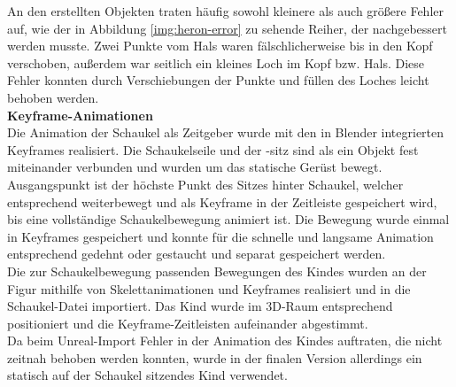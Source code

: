 \documentclass{Bericht}
\begin{document}
An den erstellten Objekten traten häufig sowohl kleinere als auch größere Fehler auf, wie der in Abbildung \ref{img:heron-error} zu sehende Reiher, der nachgebessert werden musste. Zwei Punkte vom Hals waren fälschlicherweise bis in den Kopf verschoben, außerdem war seitlich ein kleines Loch im Kopf bzw. Hals. Diese Fehler konnten durch Verschiebungen der Punkte und füllen des Loches leicht behoben werden.\\	
		 
\textbf{Keyframe-Animationen}\\
Die Animation der Schaukel als Zeitgeber wurde mit den in Blender integrierten Keyframes realisiert. Die Schaukelseile und der -sitz sind als ein Objekt fest miteinander verbunden und wurden um das statische Gerüst bewegt. Ausgangspunkt ist der höchste Punkt des Sitzes hinter Schaukel, welcher entsprechend weiterbewegt und als Keyframe in der Zeitleiste gespeichert wird, bis eine vollständige Schaukelbewegung animiert ist. Die Bewegung wurde einmal in Keyframes gespeichert und konnte für die schnelle und langsame Animation entsprechend gedehnt oder gestaucht und separat gespeichert werden.\\
Die zur Schaukelbewegung passenden Bewegungen des Kindes wurden an der Figur mithilfe von Skelettanimationen und Keyframes realisiert und in die Schaukel-Datei importiert. Das Kind wurde im 3D-Raum entsprechend positioniert und die Keyframe-Zeitleisten aufeinander abgestimmt. \\
Da beim Unreal-Import Fehler in der Animation des Kindes auftraten, die nicht zeitnah behoben werden konnten, wurde in der finalen Version allerdings ein statisch auf der Schaukel sitzendes Kind verwendet. 
		
\end{document}
